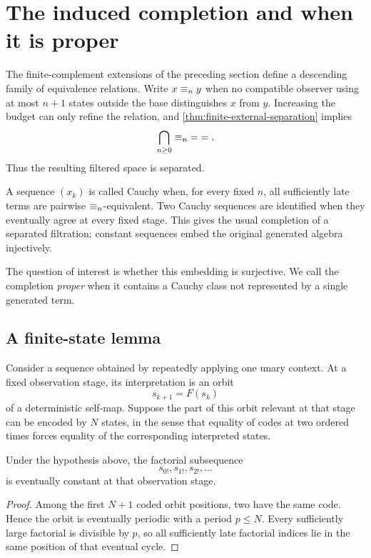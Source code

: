 \section{The induced completion and when it is proper}
\label{sec:completion}

The finite-complement extensions of the preceding section define a descending
family of equivalence relations.  Write $x\mathrel{\equiv_{n}}y$ when no compatible
observer using at most $n+1$ states outside the base distinguishes $x$ from
$y$.  Increasing the budget can only refine the relation, and
\cref{thm:finite-external-separation} implies
\[
  \bigcap_{n\ge 0}\mathrel{\equiv_{n}}\;=\;=.
\]
Thus the resulting filtered space is separated.

A sequence $(x_k)$ is called Cauchy when, for every fixed $n$, all sufficiently
late terms are pairwise $\mathrel{\equiv_{n}}$-equivalent.  Two Cauchy sequences are
identified when they eventually agree at every fixed stage.  This gives the
usual completion of a separated filtration; constant sequences embed the
original generated algebra injectively.

The question of interest is whether this embedding is surjective.  We call the
completion \emph{proper} when it contains a Cauchy class not represented by a
single generated term.

\subsection{A finite-state lemma}

Consider a sequence obtained by repeatedly applying one unary context.  At a
fixed observation stage, its interpretation is an orbit
\[
  s_{k+1}=F(s_k)
\]
of a deterministic self-map.  Suppose the part of this orbit relevant at that
stage can be encoded by $N$ states, in the sense that equality of codes at two
ordered times forces equality of the corresponding interpreted states.

\begin{lemma}
\label{lem:factorial-synchronization}
Under the hypothesis above, the factorial subsequence
\[
  s_{0!},s_{1!},s_{2!},\ldots
\]
is eventually constant at that observation stage.
\end{lemma}

\begin{proof}
Among the first $N+1$ coded orbit positions, two have the same code.  Hence the
orbit is eventually periodic with a period $p\le N$.  Every sufficiently large
factorial is divisible by $p$, so all sufficiently late factorial indices lie
in the same position of that eventual cycle.
\end{proof}

